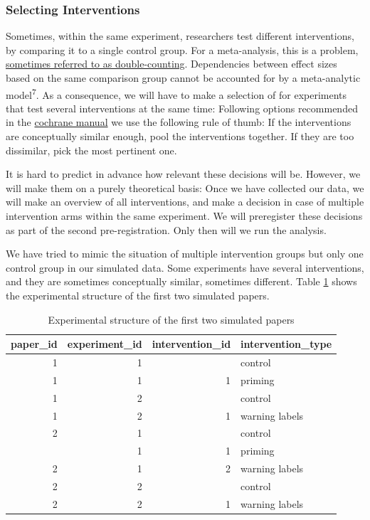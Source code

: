 \documentclass[
  man,mask,floatsintext]{apa6}
\begin{document}
\subsubsection{Selecting Interventions}\label{selecting-interventions}

Sometimes, within the same experiment, researchers test different interventions, by comparing it to a single control group. For a meta-analysis, this is a problem, \href{https://bookdown.org/MathiasHarrer/Doing_Meta_Analysis_in_R/effects.html\#unit-of-analysis}{sometimes referred to as double-counting}. Dependencies between effect sizes based on the same comparison group cannot be accounted for by a meta-analytic model\textsuperscript{7}. As a consequence, we will have to make a selection of for experiments that test several interventions at the same time: Following options recommended in the \href{https://training.cochrane.org/handbook/current/chapter-23\#section-23-3}{cochrane manual} we use the following rule of thumb: If the interventions are conceptually similar enough, pool the interventions together. If they are too dissimilar, pick the most pertinent one.

It is hard to predict in advance how relevant these decisions will be. However, we will make them on a purely theoretical basis: Once we have collected our data, we will make an overview of all interventions, and make a decision in case of multiple intervention arms within the same experiment. We will preregister these decisions as part of the second pre-registration. Only then will we run the analysis.

We have tried to mimic the situation of multiple intervention groups but only one control group in our simulated data. Some experiments have several interventions, and they are sometimes conceptually similar, sometimes different. Table \ref{tab:intervention-selection-a} shows the experimental structure of the first two simulated papers.

\begin{table}
\centering
\caption{\label{tab:intervention-selection-a}Experimental structure of the first two simulated papers}
\centering
\fontsize{10}{12}\selectfont
\begin{tabular}[t]{rrrl}
\toprule
paper\_id & experiment\_id & intervention\_id & intervention\_type\\
\midrule
1 & 1 &  & control\\
1 & 1 & 1 & priming\\
1 & 2 &  & control\\
1 & 2 & 1 & warning labels\\
2 & 1 &  & control\\
\addlinespace
2 & 1 & 1 & priming\\
2 & 1 & 2 & warning labels\\
2 & 2 &  & control\\
2 & 2 & 1 & warning labels\\
\bottomrule
\end{tabular}
\end{table}
\end{document}
